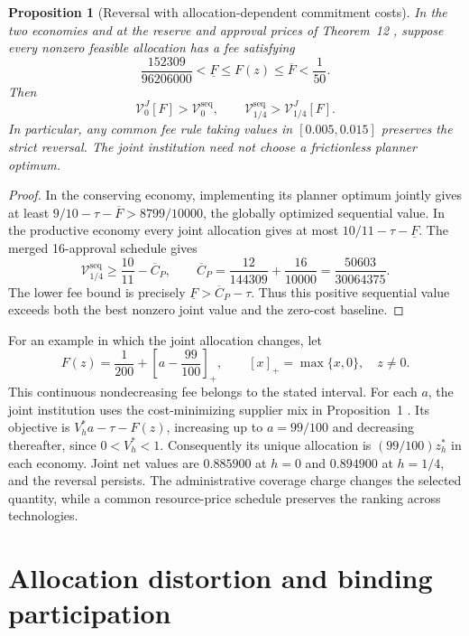 \documentclass[ecta,draft,supplement]{econsocart}
\newtheorem{proposition}[theorem]{Proposition}
\theoremstyle{definition}
\theoremstyle{definition}
\begin{document}
\begin{appendix}
\begin{proposition}[Reversal with allocation-dependent commitment costs]
\label{prop:allocationfees}
In the two economies and at the reserve and approval prices of
Theorem~12%
, suppose every nonzero feasible allocation
has a fee satisfying
\[
 \frac{152309}{96206000}<\underline F
 \leq F(z)\leq\overline F<\frac1{50}.
\]
Then
\[
 \mathcal V_0^J[F]>\mathcal V_0^{\mathrm{seq}},
 \qquad
 \mathcal V_{1/4}^{\mathrm{seq}}>\mathcal V_{1/4}^J[F].
\]
In particular, any common fee rule taking values in $[0.005,0.015]$
preserves the strict reversal. The joint institution need not choose a
frictionless planner optimum.
\end{proposition}

\begin{proof}
In the conserving economy, implementing its planner optimum jointly gives
at least $9/10-\tau-\overline F>8799/10000$, the globally optimized
sequential value. In the productive economy every joint allocation gives
at most $10/11-\tau-\underline F$. The merged 16-approval schedule gives
\[
 \mathcal V_{1/4}^{\mathrm{seq}}
 \geq\frac{10}{11}-\overline C_P,
 \qquad
 \overline C_P=\frac{12}{144309}+\frac{16}{10000}
              =\frac{50603}{30064375}.
\]
The lower fee bound is precisely
$\underline F>\overline C_P-\tau$. Thus this positive sequential value
exceeds both the best nonzero joint value and the zero-cost baseline.
\end{proof}

For an example in which the joint allocation changes, let
\[
 F(z)=\frac1{200}+\left[a-\frac{99}{100}\right]_+,
 \qquad [x]_+=\max\{x,0\},\quad z\ne0.
\]
This continuous nondecreasing fee belongs to the stated interval. For each
$a$, the joint institution uses the cost-minimizing supplier mix in
Proposition~1%
. Its objective is
$V_h^*a-\tau-F(z)$, increasing up to $a=99/100$ and decreasing thereafter,
since $0<V_h^*<1$. Consequently its unique allocation is
$(99/100)z_h^*$ in each economy. Joint net values are $0.885900$ at $h=0$
and $0.894900$ at $h=1/4$, and the reversal persists. The administrative coverage charge changes the selected quantity,
while a common resource-price schedule preserves the ranking across technologies.



\section{Allocation distortion and binding participation}
\label{app:allocationdistortion}


\end{appendix}
\end{document}
